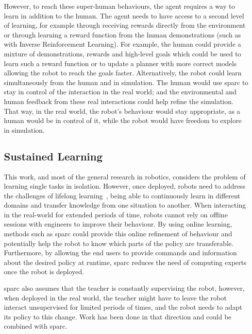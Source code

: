 However, to reach these super-human behaviours, the agent requires a way to learn in addition to the human. The agent needs to have access to a second level of learning, for example through receiving rewards directly from the environment or through learning a reward function from the human demonstrations (such as with Inverse Reinforcement Learning). For example, the human could provide a mixture of demonstrations, rewards and high-level goals which could be used to learn such a reward function or to update a planner with more correct models allowing the robot to reach the goals faster. Alternatively, the robot could learn simultaneously from the human and in simulation. The human would use \gls{sparc} to stay in control of the interaction in the real world; and the environmental and human feedback from these real interactions could help refine the simulation. That way, in the real world, the robot's behaviour would stay appropriate, as a human would be in control of it, while the robot would have freedom to explore in simulation.

\subsection{Sustained Learning}

This work, and most of the general research in robotics, considers the problem of learning single tasks in isolation. However, once deployed, robots need to address the challenges of lifelong learning~\citep{thrun1995lifelong}, being able to continuously learn in different domains and transfer knowledge from one situation to another. When interacting in the real-world for extended periods of time, robots cannot rely on offline sessions with engineers to improve their behaviour. By using online learning, methods such as \gls{sparc} could provide this online refinement of behaviour and potentially help the robot to know which parts of the policy are transferable. Furthermore, by allowing the end users to provide commands and information about the desired policy at runtime, \gls{sparc} reduces the need of computing experts once the robot is deployed. 

\gls{sparc} also assumes that the teacher is constantly supervising the robot, however, when deployed in the real world, the teacher might have to leave the robot interact unsupervised for limited periods of times, and the robot needs to adapt its policy to this change. Work has been done in that direction \citep{faulkner2018policy} and could be combined with \gls{sparc}.

